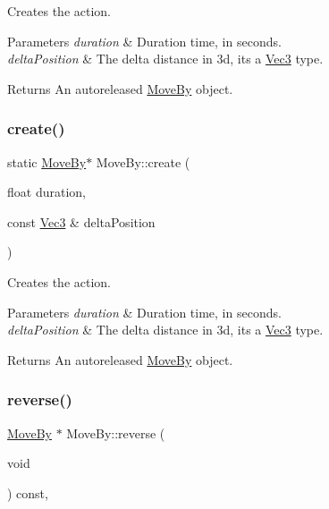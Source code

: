 Creates the action.


\begin{DoxyParams}{Parameters}
{\em duration} & Duration time, in seconds. \\
\hline
{\em delta\+Position} & The delta distance in 3d, it\textquotesingle{}s a \hyperlink{classVec3}{Vec3} type. \\
\hline
\end{DoxyParams}
\begin{DoxyReturn}{Returns}
An autoreleased \hyperlink{classMoveBy}{Move\+By} object. 
\end{DoxyReturn}
\mbox{\label{classMoveBy_a2c99e020ef5ae6bfd613ca8661f70207}} 
\subsubsection{\texorpdfstring{create()}{create()}\hspace{0.1cm}{\footnotesize\ttfamily [4/4]}}
{\footnotesize\ttfamily static \hyperlink{classMoveBy}{Move\+By}$\ast$ Move\+By\+::create (\begin{DoxyParamCaption}\item[{float}]{duration,  }\item[{const \hyperlink{classVec3}{Vec3} \&}]{delta\+Position }\end{DoxyParamCaption})\hspace{0.3cm}{\ttfamily [static]}}

Creates the action.


\begin{DoxyParams}{Parameters}
{\em duration} & Duration time, in seconds. \\
\hline
{\em delta\+Position} & The delta distance in 3d, it\textquotesingle{}s a \hyperlink{classVec3}{Vec3} type. \\
\hline
\end{DoxyParams}
\begin{DoxyReturn}{Returns}
An autoreleased \hyperlink{classMoveBy}{Move\+By} object. 
\end{DoxyReturn}
\mbox{\label{classMoveBy_a3a29609f88b72d383c31e122693185f7}} 
\subsubsection{\texorpdfstring{reverse()}{reverse()}\hspace{0.1cm}{\footnotesize\ttfamily [1/2]}}
{\footnotesize\ttfamily \hyperlink{classMoveBy}{Move\+By} $\ast$ Move\+By\+::reverse (\begin{DoxyParamCaption}\item[{void}]{ }\end{DoxyParamCaption}) const\hspace{0.3cm}{\ttfamily [override]}, {\ttfamily [virtual]}}

